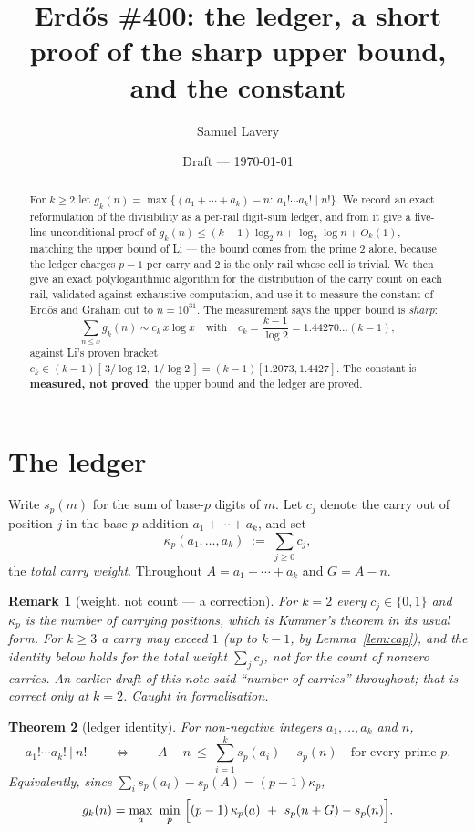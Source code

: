 \documentclass[11pt]{article}
\title{Erd\H{o}s \#400: the ledger, a short proof of the sharp upper bound,\\
and the constant}
\author{Samuel Lavery}
\date{Draft --- \today}
\newtheorem{theorem}{Theorem}
\newtheorem{remark}[theorem]{Remark}
\begin{document}
\maketitle

\begin{abstract}
For $k\ge2$ let $g_k(n)=\max\{(a_1+\cdots+a_k)-n:\ a_1!\cdots a_k!\mid n!\}$.  We record an
exact reformulation of the divisibility as a per-rail digit-sum ledger, and from it give a
five-line unconditional proof of
$g_k(n)\le(k-1)\log_2 n+\log_2\log n+O_k(1)$, matching the upper bound of Li
\cite{Li400} --- the bound comes from the prime $2$ alone, because the ledger charges
$p-1$ per carry and $2$ is the only rail whose cell is trivial.  We then give an exact
polylogarithmic algorithm for the distribution of the carry count on each rail, validated
against exhaustive computation, and use it to measure the constant of Erd\H{o}s and Graham
out to $n=10^{31}$.  The measurement says the upper bound is \emph{sharp}:
\[
  \sum_{n\le x}g_k(n)\sim c_k\,x\log x\quad\text{with}\quad
  c_k=\frac{k-1}{\log 2}=1.44270\ldots(k-1),
\]
against Li's proven bracket $c_k\in(k-1)[\,3/\log12,\ 1/\log2\,]=(k-1)[1.2073,1.4427]$.
The constant is \textbf{measured, not proved}; the upper bound and the ledger are proved.
\end{abstract}

\section{The ledger}

Write $s_p(m)$ for the sum of base-$p$ digits of $m$.  Let $c_j$ denote the carry out of
position $j$ in the base-$p$ addition $a_1+\cdots+a_k$, and set
\[
  \kappa_p(a_1,\dots,a_k)\;:=\;\sum_{j\ge0}c_j ,
\]
the \emph{total carry weight}.  Throughout $A=a_1+\cdots+a_k$ and $G=A-n$.

\begin{remark}[weight, not count --- a correction]\label{rem:weight}
For $k=2$ every $c_j\in\{0,1\}$ and $\kappa_p$ is the \emph{number} of carrying positions,
which is Kummer's theorem in its usual form.  For $k\ge3$ a carry may exceed $1$ (up to
$k-1$, by Lemma~\ref{lem:cap}), and the identity below holds for the total weight
$\sum_jc_j$, \emph{not} for the count of nonzero carries.  An earlier draft of this note
said ``number of carries'' throughout; that is correct only at $k=2$.  Caught in
formalisation.
\end{remark}

\begin{theorem}[ledger identity]\label{thm:ledger}
For non-negative integers $a_1,\dots,a_k$ and $n$,
\[
  a_1!\cdots a_k!\ \Big|\ n!
  \qquad\Longleftrightarrow\qquad
  A-n\ \le\ \sum_{i=1}^k s_p(a_i)-s_p(n)\quad\text{for every prime }p.
\]
Equivalently, since $\sum_i s_p(a_i)-s_p(A)=(p-1)\kappa_p$,
\[
  g_k(n)=\max_{a}\ \min_{p}\ \Bigl[(p-1)\,\kappa_p(a)\ +\ s_p(n+G)-s_p(n)\Bigr].
\]
\end{theorem}
\end{document}
